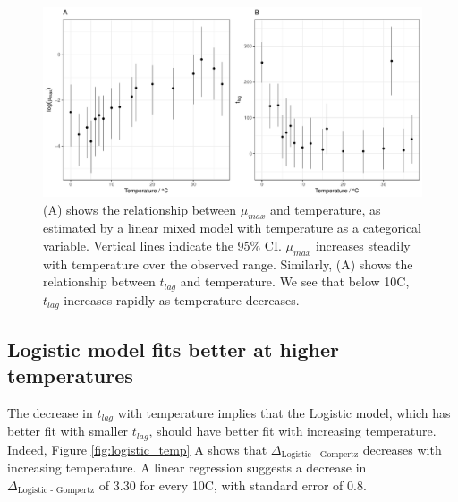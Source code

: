 \documentclass[11pt, a4paper]{article}
\begin{document}
\begin{linenumbers}
                \begin{figure}[H]
        \includegraphics[width=\linewidth]{../results/tlags.pdf}
        \caption{(A) shows the relationship between $\mu_{max}$ and temperature, as estimated by a linear mixed model with temperature as a categorical variable. Vertical lines indicate the 95\% CI. $\mu_{max}$ increases steadily with temperature over the observed range. Similarly, (A) shows the relationship between $t_{lag}$ and temperature. We see that below 10\degree C, $t_{lag}$ increases rapidly as temperature decreases.   }
        \label{fig:params_temp}
        \end{figure}  



\subsection{Logistic model fits better at higher temperatures}

The decrease in $t_{lag}$ with temperature implies that the Logistic model, which has better fit with smaller $t_{lag}$, should have better fit with increasing temperature. Indeed, Figure \ref{fig:logistic_temp} A shows that $\Delta_{\text{Logistic - Gompertz}}$  decreases with increasing temperature. A linear regression suggests a decrease in $\Delta_{\text{Logistic - Gompertz}}$ of 3.30 for every 10\degree C, with standard error of 0.8.


\end{linenumbers}
\end{document}

